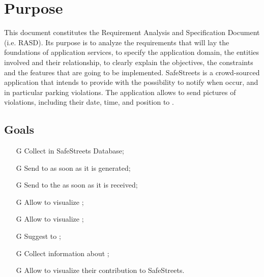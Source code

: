 \documentclass[../../rasd.tex]{subfiles}
\begin{document}
\section{Purpose\label{sect:1.1}}

This document constitutes the Requirement Analysis and Specification Document (i.e. RASD). Its purpose is to analyze the requirements that will lay the foundations of application services, to specify the application domain, the entities involved and their relationship, to clearly explain the objectives, the constraints and the features that are going to be implemented. \newline
SafeStreets is a crowd-sourced application that intends to provide  with the possibility to notify  when  occur, and in particular parking violations. The application allows  to send pictures of violations, including their date, time, and position to .
			
\subsection{Goals\label{sect:1.1.1}}

\begin{itemize}
		\item[G\subs{1}]Collect  in SafeStreets Database;
		\item[G\subs{2}]Send  to  as soon as it is generated;
		\item[G\subs{3}]Send  to the  as soon as it is received;
		\item[G\subs{4}]Allow  to visualize ;
		\item[G\subs{5}]Allow  to visualize ;
		\item[G\subs{6}]Suggest  to ;
		\item[G\subs{7}]Collect information about ;
		\item[G\subs{8}]Allow  to visualize their contribution to SafeStreets.
\end{itemize}
\end{document}
